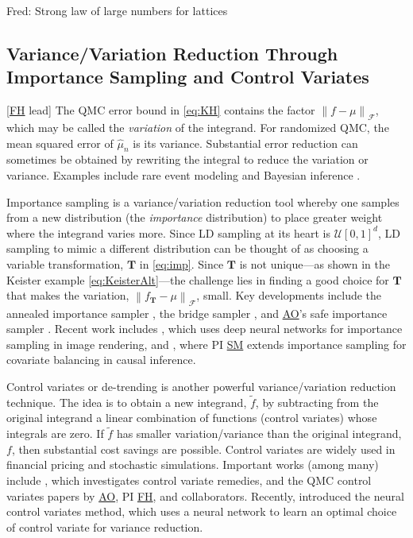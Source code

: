 \documentclass[11pt]{NSFamsart}
\newcommand{\FH}{\hyperlink{FHlink}{FH}\xspace}
\newcommand{\SM}{\hyperlink{SMlink}{SM}\xspace}
\newcommand{\AO}{\hyperlink{AOlink}{AO}\xspace}
\newcommand{\bT}{{\boldsymbol{T}}}
\newcommand{\calf}{{\mathcal{F}}}
\newcommand{\calu}{{\mathcal{U}}}
\newcommand{\norm}[2][{}]{\ensuremath{\left \lVert #2 \right \rVert}_{#1}}
\newcommand{\hmu}{\hat{\mu}}
\newcommand{\FJHNote}[1]{{\color{blue}Fred: #1}}
\begin{document}
\FJHNote{Strong law of large numbers for lattices}


\subsection{Variance/Variation Reduction Through Importance Sampling and Control Variates} [\FH lead]
The QMC error bound in \eqref{eq:KH} contains the factor $\norm[\calf]{f - \mu}$, which may be called the \emph{variation} of the integrand.  For randomized QMC, the mean squared error of $\hmu_n$ is its variance.  Substantial error reduction can sometimes be obtained by rewriting the integral to reduce the variation or variance.  Examples include rare event modeling \cite{rubino2009rare} and Bayesian inference \cite{salmeron2000importance}.

Importance sampling \cite{owen2000safe} is a variance/variation reduction tool whereby one samples from a new distribution (the \textit{importance} distribution) to place greater weight where the integrand varies more. Since LD sampling at its heart is $\calu[0,1]^d$, LD sampling to mimic a different distribution can be thought of as choosing a variable transformation, $\bT$ in \eqref{eq:imp}.
Since $\bT$ is not unique---as shown in the Keister example \eqref{eq:KeisterAlt}---the challenge lies in finding a good choice for $\bT$ that makes the variation, $\norm[\calf]{f_{\bT} - \mu}$, small. Key developments include the annealed importance sampler \cite{neal2001annealed}, the bridge sampler \cite{gelman1998simulating}, and \AO's safe importance sampler \cite{owen2000safe}. Recent work includes \cite{mueller2019neural}, which uses deep neural networks for importance sampling in image rendering, and \cite{huling2020energy}, where PI \SM extends importance sampling for covariate balancing in causal inference.

Control variates or de-trending \cite{Gla03} is another powerful variance/variation reduction technique. The idea is to obtain a new integrand, $\tilde{f}$, by subtracting from the original integrand a linear combination of functions (control variates) whose integrals are zero.  If $\tilde{f}$ has smaller variation/variance than the original integrand, $f$, then substantial cost savings are possible.  Control variates are widely used in financial pricing and stochastic simulations. Important works (among many) include \cite{nelson1990control}, which investigates control variate remedies, and the QMC control variates papers \cite{HicEtal03, Hic17a} by \AO, PI \FH, and collaborators. Recently, \cite{mueller20neural} introduced the neural control variates method, which uses a neural network to learn an optimal choice of control variate for variance reduction.
\end{document}
